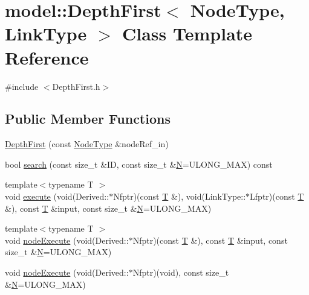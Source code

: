 \hypertarget{classmodel_1_1_depth_first}{}\section{model\+:\+:Depth\+First$<$ Node\+Type, Link\+Type $>$ Class Template Reference}
\label{classmodel_1_1_depth_first}


{\ttfamily \#include $<$Depth\+First.\+h$>$}

\subsection*{Public Member Functions}
\begin{DoxyCompactItemize}
\item 
\hyperlink{classmodel_1_1_depth_first_a7e563ae47f78286b5de01dd6adca5a5b}{Depth\+First} (const \hyperlink{_network_typedefs_8h_a723f680c66f6a92647827790bcbafce0}{Node\+Type} \&node\+Ref\+\_\+in)
\item 
bool \hyperlink{classmodel_1_1_depth_first_a771585f9525518e30ee2a76aca351170}{search} (const size\+\_\+t \&I\+D, const size\+\_\+t \&\hyperlink{thompson__tetrahedron_8m_a7823765a845eb81829f110d8337f81ae}{N}=U\+L\+O\+N\+G\+\_\+\+M\+A\+X) const 
\item 
{\footnotesize template$<$typename T $>$ }\\void \hyperlink{classmodel_1_1_depth_first_af3af2d7020b4327e683f8119b0cde931}{execute} (void(Derived\+::$\ast$Nfptr)(const \hyperlink{_spline_node_base__corder1_8h_a82692d3a5502b91460591f1d5504314a}{T} \&), void(Link\+Type\+::$\ast$Lfptr)(const \hyperlink{_spline_node_base__corder1_8h_a82692d3a5502b91460591f1d5504314a}{T} \&), const \hyperlink{_spline_node_base__corder1_8h_a82692d3a5502b91460591f1d5504314a}{T} \&input, const size\+\_\+t \&\hyperlink{thompson__tetrahedron_8m_a7823765a845eb81829f110d8337f81ae}{N}=U\+L\+O\+N\+G\+\_\+\+M\+A\+X)
\item 
{\footnotesize template$<$typename T $>$ }\\void \hyperlink{classmodel_1_1_depth_first_a8ff5dea9674464c0165abdd0dd080fce}{node\+Execute} (void(Derived\+::$\ast$Nfptr)(const \hyperlink{_spline_node_base__corder1_8h_a82692d3a5502b91460591f1d5504314a}{T} \&), const \hyperlink{_spline_node_base__corder1_8h_a82692d3a5502b91460591f1d5504314a}{T} \&input, const size\+\_\+t \&\hyperlink{thompson__tetrahedron_8m_a7823765a845eb81829f110d8337f81ae}{N}=U\+L\+O\+N\+G\+\_\+\+M\+A\+X)
\item 
void \hyperlink{classmodel_1_1_depth_first_a631c96df185d294da998277f7dec74c8}{node\+Execute} (void(Derived\+::$\ast$Nfptr)(void), const size\+\_\+t \&\hyperlink{thompson__tetrahedron_8m_a7823765a845eb81829f110d8337f81ae}{N}=U\+L\+O\+N\+G\+\_\+\+M\+A\+X)
\end{DoxyCompactItemize}


